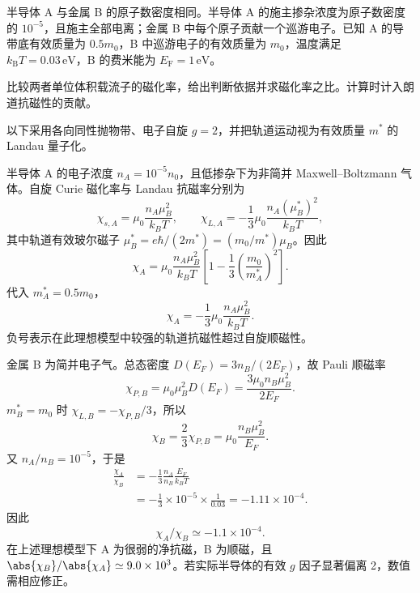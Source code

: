 \begin{question}[10 分]
半导体 A 与金属 B 的原子数密度相同。半导体 A 的施主掺杂浓度为原子数密度的 $10^{-5}$，且施主全部电离；金属 B 中每个原子贡献一个巡游电子。已知 A 的导带底有效质量为 $0.5m_0$，B 中巡游电子的有效质量为 $m_0$，温度满足 $k_{\mathrm B}T=0.03\,\mathrm{eV}$，B 的费米能为 $E_{\mathrm F}=1\,\mathrm{eV}$。

比较两者单位体积载流子的磁化率，给出判断依据并求磁化率之比。计算时计入朗道抗磁性的贡献。


\begin{solution}
以下采用各向同性抛物带、电子自旋 $g=2$，并把轨道运动视为有效质量 $m^*$ 的 Landau 量子化。

半导体 A 的电子浓度
$n_A=10^{-5}n_0$，且低掺杂下为非简并 Maxwell--Boltzmann 气体。自旋 Curie 磁化率与 Landau 抗磁率分别为
\[
 \chi_{s,A}=\mu_0\frac{n_A\mu_B^2}{k_BT},
 \qquad
 \chi_{L,A}=-\frac13\mu_0\frac{n_A(\mu_B^*)^2}{k_BT},
\]
其中轨道有效玻尔磁子
$\mu_B^*=e\hbar/(2m^*)=(m_0/m^*)\mu_B$。因此
\[
 \chi_A=\mu_0\frac{n_A\mu_B^2}{k_BT}
 \left[1-\frac13\left(\frac{m_0}{m_A^*}\right)^2\right].
\]
代入 $m_A^*=0.5m_0$，
\[
 \chi_A=-\frac13\mu_0\frac{n_A\mu_B^2}{k_BT}.
\]
负号表示在此理想模型中较强的轨道抗磁性超过自旋顺磁性。

金属 B 为简并电子气。总态密度
$D(E_F)=3n_B/(2E_F)$，故 Pauli 顺磁率
\[
 \chi_{P,B}=\mu_0\mu_B^2D(E_F)
 =\frac{3\mu_0n_B\mu_B^2}{2E_F}.
\]
$m_B^*=m_0$ 时
$\chi_{L,B}=-\chi_{P,B}/3$，所以
\[
 \chi_B=\frac23\chi_{P,B}
 =\mu_0\frac{n_B\mu_B^2}{E_F}.
\]
又 $n_A/n_B=10^{-5}$，于是
\[
\begin{aligned}
 \frac{\chi_A}{\chi_B}
 &=-\frac13\frac{n_A}{n_B}\frac{E_F}{k_BT}\\
 &=-\frac13\times10^{-5}\times\frac{1}{0.03}
 =-1.11\times10^{-4}.
\end{aligned}
\]
因此
\[
 \boxed{\chi_A/\chi_B\simeq-1.1\times10^{-4}.}
\]
在上述理想模型下 A 为很弱的净抗磁，B 为顺磁，且
$\abs{\chi_B}/\abs{\chi_A}\simeq9.0\times10^3$。若实际半导体的有效 $g$ 因子显著偏离 2，数值需相应修正。
\end{solution}
\end{question}

